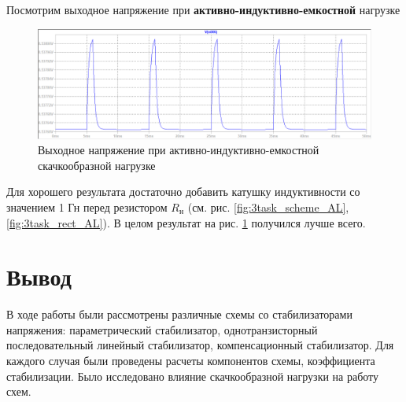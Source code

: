 \documentclass[a4paper, 12pt]{article}
\begin{document}
    \noindent Посмотрим выходное напряжение при \textbf{активно-индуктивно-емкостной} нагрузке
    \begin{figure}[H]
        \centering
        \includegraphics[scale=0.46]{3task_rect_ALC.png}
        \captionsetup{skip=0pt}
        \caption{Выходное напряжение при активно-индуктивно-емкостной скачкообразной нагрузке}
        \label{fig:3task_rect_ALC}
    \end{figure}
    \noindent Для хорошего результата достаточно добавить катушку индуктивности со значением 1 Гн перед резистором $R_\text{н}$
    (см. рис. \ref{fig:3task_scheme_AL}, \ref{fig:3task_rect_AL}). В целом результат на рис. \ref{fig:3task_rect_ALC} получился лучше всего.


    \section{Вывод}
    В ходе работы были рассмотрены различные схемы со стабилизаторами напряжения:
    параметрический стабилизатор, однотранзисторный последовательный
    линейный стабилизатор, компенсационный стабилизатор. Для каждого
    случая были проведены расчеты компонентов схемы,
    коэффициента стабилизации. Было исследовано влияние скачкообразной
    нагрузки на работу схем.
\end{document}
